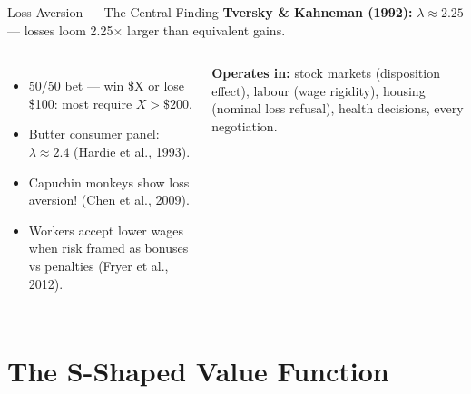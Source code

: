 \documentclass[aspectratio=169]{beamer}
\begin{document}
\begin{frame}{Loss Aversion --- The Central Finding}
\textcolor{beblue}{\textbf{Tversky \& Kahneman (1992):}} $\lambda \approx 2.25$ --- losses loom 2.25$\times$ larger than equivalent gains.
\begin{columns}
\begin{itemize}[<+->]\small
  \item 50/50 bet --- win \$X or lose \$100: most require $X > \$200$.
  \item Butter consumer panel: $\lambda \approx 2.4$ (Hardie et al., 1993).
  \item Capuchin monkeys show loss aversion! (Chen et al., 2009).
  \item Workers accept lower wages when risk framed as bonuses vs penalties (Fryer et al., 2012).
\end{itemize}
\textcolor{beteal}{\textbf{Operates in:}} stock markets (disposition effect), labour (wage rigidity), housing (nominal loss refusal), health decisions, every negotiation.
\end{columns}
\end{frame}

\section{The S-Shaped Value Function}
\end{document}
